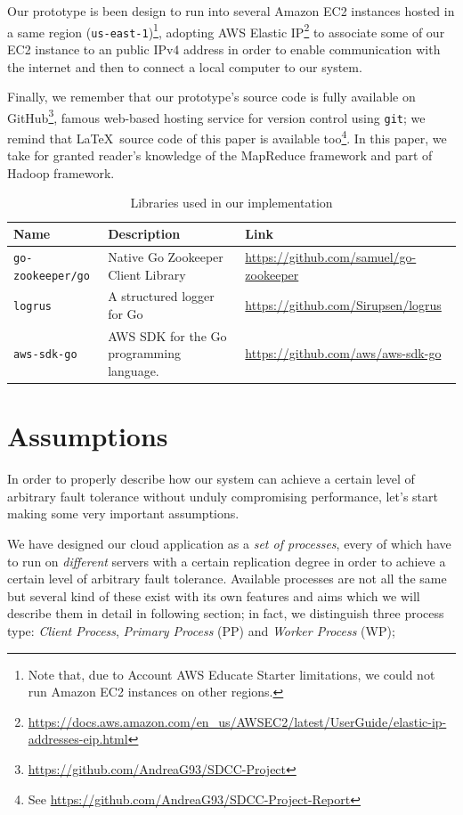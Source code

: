 \documentclass[sigchi]{acmart}
\begin{document}
Our prototype is been design to run into several Amazon EC2 instances hosted in a same region (\texttt{us-east-1})\footnote{Note that, due to Account AWS Educate Starter limitations, we could not run Amazon EC2 instances on other regions.}, adopting AWS Elastic IP\footnote{\url{https://docs.aws.amazon.com/en_us/AWSEC2/latest/UserGuide/elastic-ip-addresses-eip.html}} to associate some of our EC2 instance to an public IPv4 address in order to enable communication with the internet and then to connect a local computer to our system. 

Finally, we remember that our prototype's source code is fully available on GitHub\footnote{\url{https://github.com/AndreaG93/SDCC-Project}}, famous web-based hosting service for version control using \texttt{git}; we remind that \LaTeX\ source code of this paper is available too\footnote{See \url{https://github.com/AndreaG93/SDCC-Project-Report}}. In this paper, we take for granted reader's knowledge of the MapReduce framework and part of Hadoop framework.


\begin{table}
  \caption{Libraries used in our implementation}
  \label{tab:libraries}
  \begin{tabular}{l|l|l}
    \toprule
    Name & Description & Link \\
    \midrule
    \texttt{go-zookeeper/go} & Native Go Zookeeper Client Library & \url{https://github.com/samuel/go-zookeeper} \\
    \texttt{logrus} & A structured logger for Go & \url{https://github.com/Sirupsen/logrus} \\
    \texttt{aws-sdk-go} & AWS SDK for the Go programming language. & \url{https://github.com/aws/aws-sdk-go} \\
    \bottomrule
  \end{tabular}
\end{table}

\section{Assumptions}

In order to properly describe how our system can achieve a certain level of arbitrary fault tolerance without unduly compromising performance, let's start making some very important assumptions.

We have designed our cloud application as a \textit{set of processes}, every of which have to run on \textit{different} servers with a certain replication degree in order to achieve a certain level of arbitrary fault tolerance. Available processes are not all the same but several kind of these exist with its own features and aims which we will describe them in detail in following section; in fact, we distinguish three process type: \textit{Client Process}, \textit{Primary Process} (PP) and \textit{Worker Process} (WP); 
\end{document}
